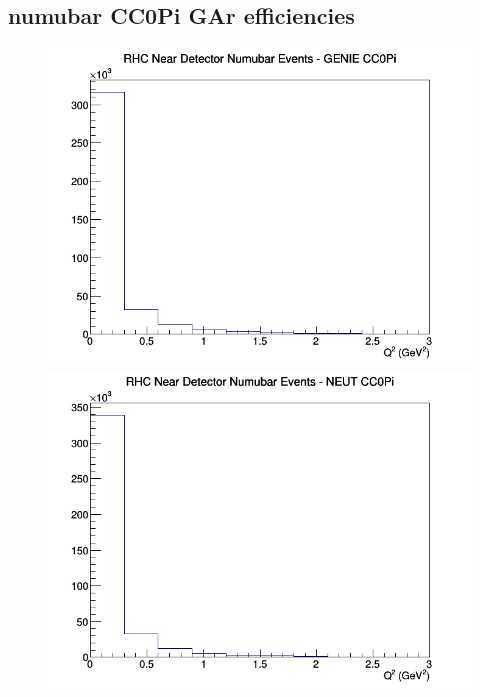 \subsection{numubar CC0Pi GAr efficiencies}
\begin{figure}[h]
\includegraphics[width=\linewidth]{eff_Q2/GAr/CC0Pi_RHC_ND_numubar_Q2_GENIE.png}
\endminipage
{}
\includegraphics[width=\linewidth]{eff_Q2/GAr/CC0Pi_RHC_ND_numubar_Q2_NEUT.png}
\endminipage
{}

\end{figure}
